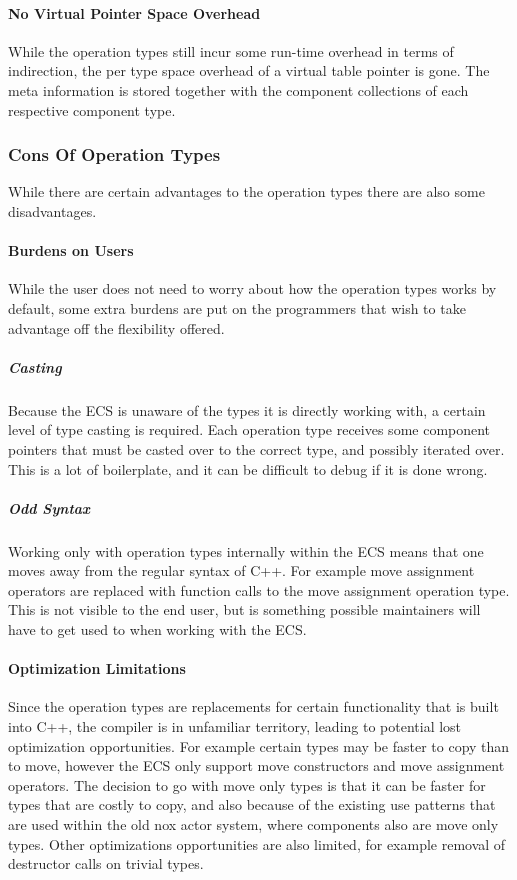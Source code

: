 \paragraph{No Virtual Pointer Space Overhead}
While the operation types still incur some run-time overhead in terms of indirection,
the per type space overhead of a virtual table pointer is gone.
The meta information is stored together with the component collections of each respective component type.

\subsubsection{Cons Of Operation Types}
While there are certain advantages to the operation types there are also some disadvantages.

\paragraph{Burdens on Users}
While the user does not need to worry about how the operation types works by default,
some extra burdens are put on the programmers that wish to take advantage off the flexibility offered.

\subparagraph{Casting}
Because the ECS is unaware of the types it is directly working with, a certain level of type casting is required.
Each operation type receives some component pointers that must be casted over to the correct type,
and possibly iterated over. This is a lot of boilerplate, and it can be difficult to debug if it is done wrong.

\subparagraph{Odd Syntax}
Working only with operation types internally within the ECS means that one moves away from the regular syntax of C++.
For example move assignment operators are replaced with function calls to the move assignment operation type.
This is not visible to the end user, but is something possible maintainers will have to get used to when working with the ECS.

\paragraph{Optimization Limitations}
Since the operation types are replacements for certain functionality that is built into C++, the compiler is in
unfamiliar territory, leading to potential lost optimization opportunities.
For example certain types may be faster to copy than to move, however the ECS only support move constructors
and move assignment operators.
The decision to go with move only types is that it can be faster for types that are costly to copy,
and also because of the existing use patterns that are used within the old nox actor system, where components
also are move only types.
Other optimizations opportunities are also limited, for example removal of destructor calls on trivial types.

